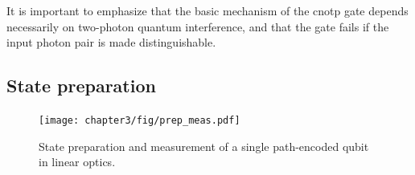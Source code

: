 It is important to emphasize that the basic mechanism of the \gls{cnotp} gate depends necessarily on two-photon quantum interference, and that the gate fails if the input photon pair is made distinguishable.

\subsection{State preparation} 
\label{sec:cnotmz-state-preparation}
\begin{figure}[t!]
\centering
\texttt{[image: chapter3/fig/prep\_meas.pdf]}
\caption[Single-qubit state preparation and measurement]
{
    State preparation and measurement of a single path-encoded qubit in linear optics.
}
\label{fig:prep-meas}
\end{figure}

